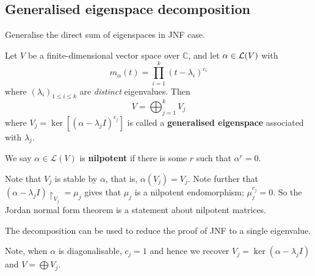 \documentclass[a4paper,11pt]{article}
\begin{document}
\subsection{Generalised eigenspace decomposition}
Generalise the direct sum of eigenspaces in JNF case. 
\begin{theorem}
	Let $ V $ be a finite-dimensional vector space over $\mathbb{C}$, and let $ \alpha\in {\mathcal{L}}(V) $ with
	\[
		m_\alpha(t) = \prod_{i=1}^k (t - \lambda_i)^{c_i}
	\]
	where $ (\lambda_i)_{1\le i\le k} $ are \textit{distinct} eigenvalues. Then 
	\[
		V = \bigoplus_{j=1}^k V_j
	\]
	where \( V_j = \ker[(\alpha - \lambda_j I)^{c_j}] \) is called a \textbf{generalised eigenspace} associated with \( \lambda_j \).	
\end{theorem}
\begin{definition}
	We say $\alpha \in \mathcal{L}(V)$ is \textbf{nilpotent} if there is some $r$ such that $\alpha^r = 0$.
  \end{definition}

  \begin{remark}
	Note that \( V_j \) is stable by \( \alpha \), that is, \( \alpha(V_j) = V_j \).
	Note further that \( {(\alpha - \lambda_j I)}\restriction_{V_j} = \mu_j \) gives that \( \mu_j \) is a nilpotent endomorphism; \( \mu_j^{c_j} = 0 \).
	So the Jordan normal form theorem is a statement about nilpotent matrices.

	The decomposition can be used to reduce the proof of JNF to a single eigenvalue. 

	Note, when \( \alpha \) is diagonalisable, \( c_j = 1 \) and hence we recover \( V_j = \ker(\alpha - \lambda_j I) \) and \( V = \bigoplus V_j \).
\end{remark}
\end{document}

